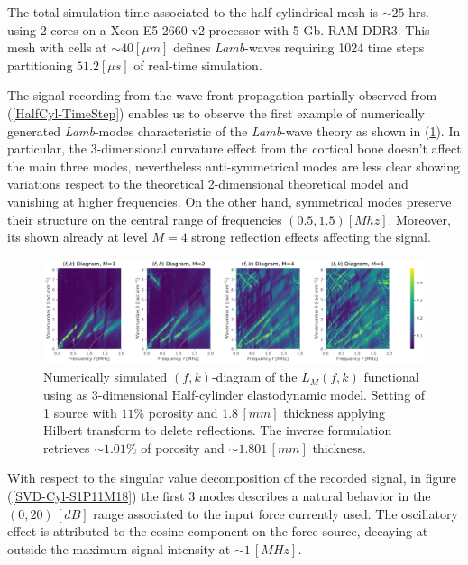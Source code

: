 \begin{rem}
The total simulation time associated to the half-cylindrical mesh is $\sim 25$ hrs. using 2 cores on a Xeon E5-2660 v2 processor with 5 Gb. RAM DDR3. This mesh with cells at $\sim 40 [\mu m]$ defines \textit{Lamb}-waves requiring 1024 time steps partitioning $51.2 [\mu s]$ of real-time simulation. 
\end{rem}

The signal recording from the wave-front propagation partially observed from (\ref{HalfCyl-TimeStep}) enables us to observe the first example of numerically generated \textit{Lamb}-modes characteristic of the \textit{Lamb}-wave theory as shown in (\ref{FK-Cyl-DiagramS1P11M18}). In particular, the 3-dimensional curvature effect from the cortical bone doesn't affect the main three modes, nevertheless anti-symmetrical modes are less clear showing variations respect to the theoretical 2-dimensional theoretical model and vanishing at higher frequencies. On the other hand, symmetrical modes preserve their structure on the central range of frequencies $(0.5, 1.5) [Mhz]$. Moreover, its shown already at level $M=4$ strong reflection effects affecting the signal.
\begin{figure}[!h]
	\centering
	\includegraphics[width=\textwidth]{images/ClusterSim/3DCylTimeP11TransIsoFKW18.pdf}
	\caption{Numerically simulated $(f,k)$-diagram of the $L_M(f,k)$ functional using as 3-dimensional Half-cylinder elastodynamic model. Setting of 1 source with $11\%$ porosity and $1.8\,[mm]$ thickness applying Hilbert transform to delete reflections. The inverse formulation retrieves $\sim 1.01\%$ of porosity and $\sim 1.801 \,[mm]$ thickness.}
	\label{FK-Cyl-DiagramS1P11M18}
\end{figure} 
With respect to the singular value decomposition of the recorded signal, in figure (\ref{SVD-Cyl-S1P11M18}) the first 3 modes describes a natural behavior in the $(0, 20) \, [dB]$ range associated to the input force currently used. The oscillatory effect is attributed to the cosine component on the force-source, decaying at outside the maximum signal intensity at $\sim 1 \, [MHz]$.
